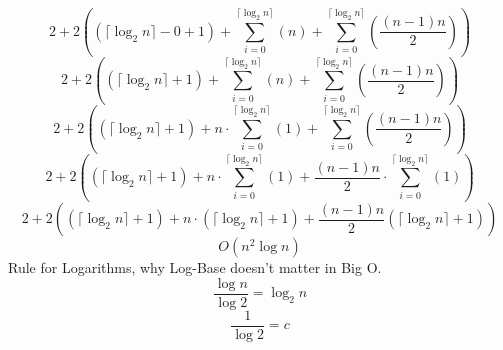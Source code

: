 \documentclass{article}
\begin{document}
$$2+2\left(\left(\lceil\log_2n\rceil-0+1\right)+\sum_{i=0}^{\lceil\log_2n\rceil}\left(n\right)+\sum_{i=0}^{\lceil\log_2n\rceil}\left(\frac{\left(n-1\right)n}{2}\right)\right)$$
$$2+2\left(\left(\lceil\log_2n\rceil+1\right)+\sum_{i=0}^{\lceil\log_2n\rceil}\left(n\right)+\sum_{i=0}^{\lceil\log_2n\rceil}\left(\frac{\left(n-1\right)n}{2}\right)\right)$$
$$2+2\left(\left(\lceil\log_2n\rceil+1\right)+n\cdot\sum_{i=0}^{\lceil\log_2n\rceil}\left(1\right)+\sum_{i=0}^{\lceil\log_2n\rceil}\left(\frac{\left(n-1\right)n}{2}\right)\right)$$
$$2+2\left(\left(\lceil\log_2n\rceil+1\right)+n\cdot\sum_{i=0}^{\lceil\log_2n\rceil}\left(1\right)+\frac{\left(n-1\right)n}{2}\cdot\sum_{i=0}^{\lceil\log_2n\rceil}\left(1\right)\right)$$
$$2+2\left(\left(\lceil\log_2n\rceil+1\right)+n\cdot\left(\lceil\log_2n\rceil+1\right)+\frac{\left(n-1\right)n}{2}\left(\lceil\log_2n\rceil+1\right)\right)$$
$$O(n^2\log n)$$
Rule for Logarithms, why Log-Base doesn't matter in Big O.
$$\frac{\log n}{\log 2}=\log_2 n$$
$$\frac{1}{\log 2}=c$$
\end{document}
